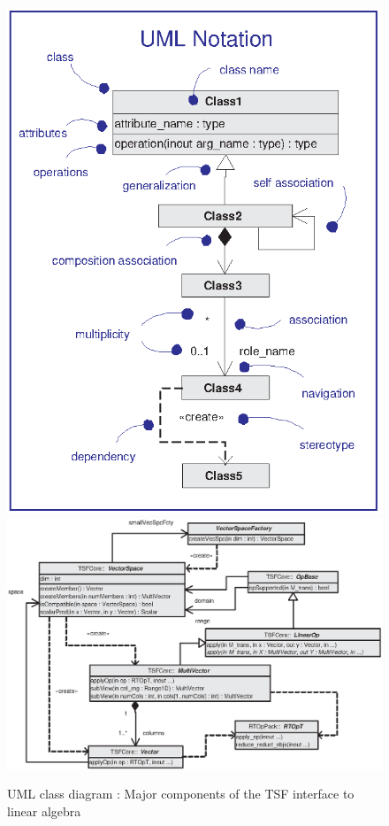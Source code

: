 \documentclass[10pt,fleqn]{article}
\begin{document}
{\bsinglespace
\begin{figure}
\begin{center}
\includegraphics*[bb= 0.0in 0.0in 3.3in 4.4in,scale=0.50
]{UML1}
\includegraphics*[bb= 0.0in 0.0in 6.55in 4.4in,scale=0.70
]{TSFCore}
\end{center}
\caption{
\label{tsfcore:fig:tsfl_basic}
UML class diagram : Major components of the TSF
interface to linear algebra
}
\end{figure}
\esinglespace}
\end{document}
